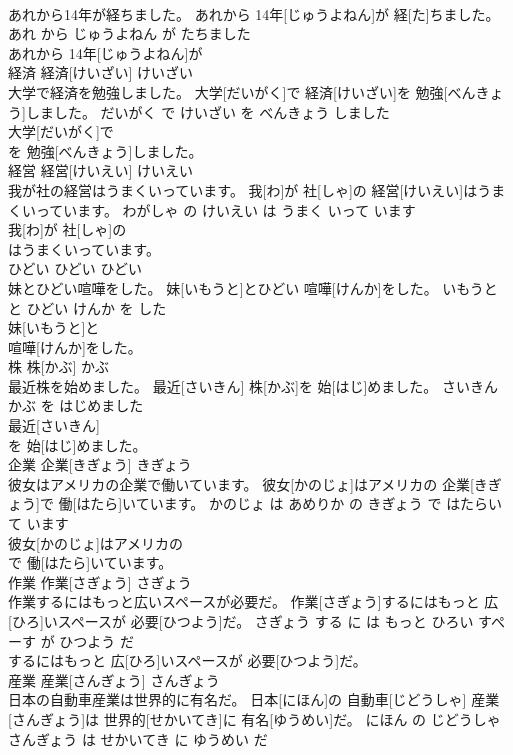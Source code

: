 \documentclass[8pt]{extreport}
\begin{document}
\begin{CJK}{UTF8}{min}
\\	あれから14年が経ちました。	あれから 14年[じゅうよねん]が 経[た]ちました。	あれ から じゅうよねん が たちました	
\\	あれから 14年[じゅうよねん]が
\\	経済	経済[けいざい]	けいざい	
\\	大学で経済を勉強しました。	大学[だいがく]で 経済[けいざい]を 勉強[べんきょう]しました。	だいがく で けいざい を べんきょう しました	
\\	大学[だいがく]で
\\	を 勉強[べんきょう]しました。			
\\	経営	経営[けいえい]	けいえい	
\\	我が社の経営はうまくいっています。	我[わ]が 社[しゃ]の 経営[けいえい]はうまくいっています。	わがしゃ の けいえい は うまく いって います	
\\	我[わ]が 社[しゃ]の
\\	はうまくいっています。			
\\	ひどい	ひどい	ひどい	
\\	妹とひどい喧嘩をした。	妹[いもうと]とひどい 喧嘩[けんか]をした。	いもうと と ひどい けんか を した	
\\	妹[いもうと]と
\\	喧嘩[けんか]をした。			
\\	株	株[かぶ]	かぶ	
\\	最近株を始めました。	最近[さいきん] 株[かぶ]を 始[はじ]めました。	さいきん かぶ を はじめました	
\\	最近[さいきん]
\\	を 始[はじ]めました。			
\\	企業	企業[きぎょう]	きぎょう	
\\	彼女はアメリカの企業で働いています。	彼女[かのじょ]はアメリカの 企業[きぎょう]で 働[はたら]いています。	かのじょ は あめりか の きぎょう で はたらいて います	
\\	彼女[かのじょ]はアメリカの
\\	で 働[はたら]いています。			
\\	作業	作業[さぎょう]	さぎょう	
\\	作業するにはもっと広いスペースが必要だ。	作業[さぎょう]するにはもっと 広[ひろ]いスペースが 必要[ひつよう]だ。	さぎょう する に は もっと ひろい すぺーす が ひつよう だ	
\\	するにはもっと 広[ひろ]いスペースが 必要[ひつよう]だ。			
\\	産業	産業[さんぎょう]	さんぎょう	
\\	日本の自動車産業は世界的に有名だ。	日本[にほん]の 自動車[じどうしゃ] 産業[さんぎょう]は 世界的[せかいてき]に 有名[ゆうめい]だ。	にほん の じどうしゃ さんぎょう は せかいてき に ゆうめい だ	

\end{CJK}
\end{document}
